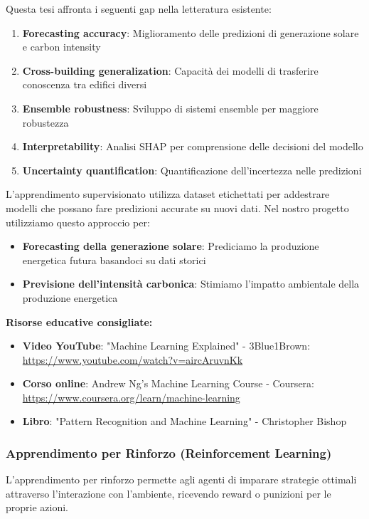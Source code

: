 \documentclass[12pt,a4paper,twoside]{report}
\begin{document}
Questa tesi affronta i seguenti gap nella letteratura esistente:

\begin{enumerate}
    \item \textbf{Forecasting accuracy}: Miglioramento delle predizioni di generazione solare e carbon intensity
    \item \textbf{Cross-building generalization}: Capacità dei modelli di trasferire conoscenza tra edifici diversi
    \item \textbf{Ensemble robustness}: Sviluppo di sistemi ensemble per maggiore robustezza
    \item \textbf{Interpretability}: Analisi SHAP per comprensione delle decisioni del modello
    \item \textbf{Uncertainty quantification}: Quantificazione dell'incertezza nelle predizioni
\end{enumerate}

L'apprendimento supervisionato utilizza dataset etichettati per addestrare modelli che possano fare predizioni accurate su nuovi dati. Nel nostro progetto utilizziamo questo approccio per:

\begin{itemize}
    \item \textbf{Forecasting della generazione solare}: Prediciamo la produzione energetica futura basandoci su dati storici
    \item \textbf{Previsione dell'intensità carbonica}: Stimiamo l'impatto ambientale della produzione energetica
\end{itemize}

\textbf{Risorse educative consigliate:}
\begin{itemize}
    \item \textbf{Video YouTube}: "Machine Learning Explained" - 3Blue1Brown: \url{https://www.youtube.com/watch?v=aircAruvnKk}
    \item \textbf{Corso online}: Andrew Ng's Machine Learning Course - Coursera: \url{https://www.coursera.org/learn/machine-learning}
    \item \textbf{Libro}: "Pattern Recognition and Machine Learning" - Christopher Bishop
\end{itemize}

\subsubsection{Apprendimento per Rinforzo (Reinforcement Learning)}
L'apprendimento per rinforzo permette agli agenti di imparare strategie ottimali attraverso l'interazione con l'ambiente, ricevendo reward o punizioni per le proprie azioni.
\end{document}
